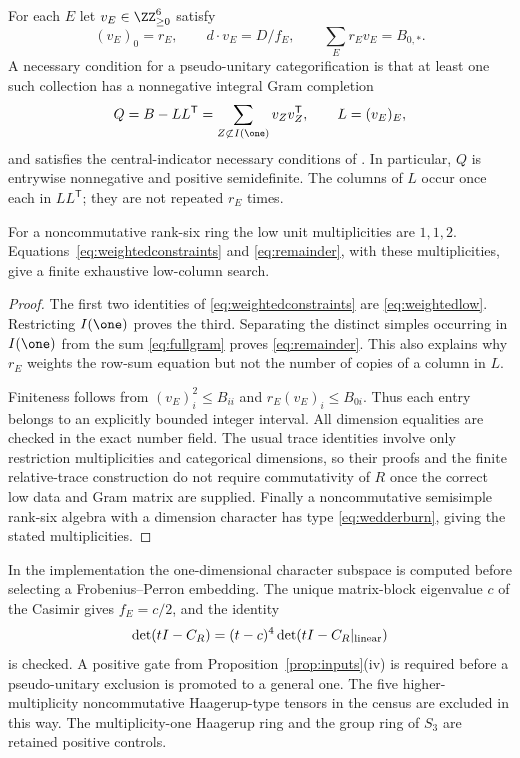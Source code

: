 \begin{theorem}\label{thm:weighted}
For each $E$ let $v_E\in\ZZ_{\ge0}^6$ satisfy
\begin{equation}\label{eq:weightedconstraints}
 (v_E)_0=r_E,\qquad
 d\cdot v_E=D/f_E,\qquad
 \sum_E r_Ev_E=B_{0,*}.
\end{equation}
A necessary condition for a pseudo-unitary categorification is that at
least one such collection has a nonnegative integral Gram completion
\begin{equation}\label{eq:remainder}
 Q=B-LL^{\mathsf T}=\sum_{Z\not\subset I(\one)}v_Zv_Z^{\mathsf T},
 \qquad L=(v_E)_E,
\end{equation}
and satisfies the central-indicator necessary conditions of
\cite{DP4,DP5}. In particular, $Q$ is entrywise nonnegative and positive
semidefinite. The columns of $L$ occur once each in $LL^{\mathsf T}$;
they are not repeated $r_E$ times.

For a noncommutative rank-six ring the low unit multiplicities are
$1,1,2$. Equations~\eqref{eq:weightedconstraints} and
\eqref{eq:remainder}, with these multiplicities, give a finite exhaustive
low-column search.
\end{theorem}
\begin{proof}
The first two identities of \eqref{eq:weightedconstraints} are
\eqref{eq:weightedlow}. Restricting $I(\one)$ proves the third.
Separating the distinct simples occurring in $I(\one)$ from the sum
\eqref{eq:fullgram} proves \eqref{eq:remainder}. This also explains why
$r_E$ weights the row-sum equation but not the number of copies of a
column in $L$.

Finiteness follows from
$(v_E)_i^2\le B_{ii}$ and
$r_E(v_E)_i\le B_{0i}$. Thus each entry belongs to an explicitly bounded
integer interval. All dimension equalities are checked in the exact
number field. The usual trace identities involve only restriction
multiplicities and categorical dimensions, so their proofs and the
finite relative-trace construction do not require commutativity of $R$
once the correct low data and Gram matrix are supplied. Finally a
noncommutative semisimple rank-six algebra with a dimension character
has type \eqref{eq:wedderburn}, giving the stated multiplicities.
\end{proof}

In the implementation the one-dimensional character subspace is
computed before selecting a Frobenius--Perron embedding. The unique
matrix-block eigenvalue $c$ of the Casimir gives $f_E=c/2$, and the
identity
\[
 \det(tI-C_R)=(t-c)^4\det(tI-C_R|_{\rm linear})
\]
is checked. A positive gate from Proposition~\ref{prop:inputs}(iv) is
required before a pseudo-unitary exclusion is promoted to a general
one. The five higher-multiplicity noncommutative Haagerup-type tensors
in the census are excluded in this way. The multiplicity-one Haagerup
ring and the group ring of $S_3$ are retained positive controls.

